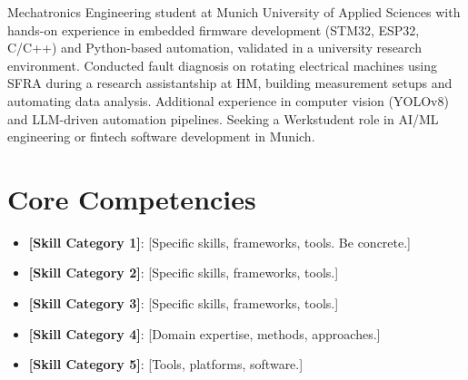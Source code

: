 \documentclass[11pt,a4paper,sans]{moderncv}
\begin{document}
\makecvtitle


\vspace{6pt}
\small{Mechatronics Engineering student at Munich University of Applied Sciences with hands-on experience in embedded firmware development (STM32, ESP32, C/C++) and Python-based automation, validated in a university research environment. Conducted fault diagnosis on rotating electrical machines using SFRA during a research assistantship at HM, building measurement setups and automating data analysis. Additional experience in computer vision (YOLOv8) and LLM-driven automation pipelines. Seeking a Werkstudent role in AI/ML engineering or fintech software development in Munich.}


\section{Core Competencies}
\vspace{1pt}
\begin{itemize}

\item \textbf{[Skill Category 1]}: [Specific skills, frameworks, tools. Be concrete.]

\item \textbf{[Skill Category 2]}: [Specific skills, frameworks, tools.]

\item \textbf{[Skill Category 3]}: [Specific skills, frameworks, tools.]

\item \textbf{[Skill Category 4]}: [Domain expertise, methods, approaches.]

\item \textbf{[Skill Category 5]}: [Tools, platforms, software.]

\end{itemize}

\end{document}
